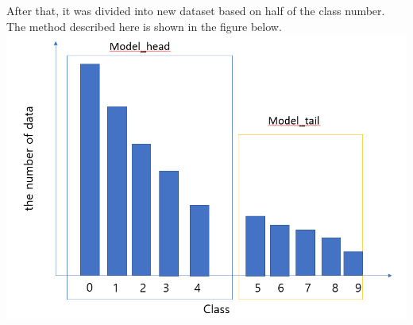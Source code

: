 \documentclass[extendedabs]{bmvc2k}
\begin{document}
    After that, it was divided into new dataset based on half of the class number. The method described here is shown in the figure below.
    \newline  \includegraphics[width=\linewidth]{images/08_project.PNG}
\end{document}
